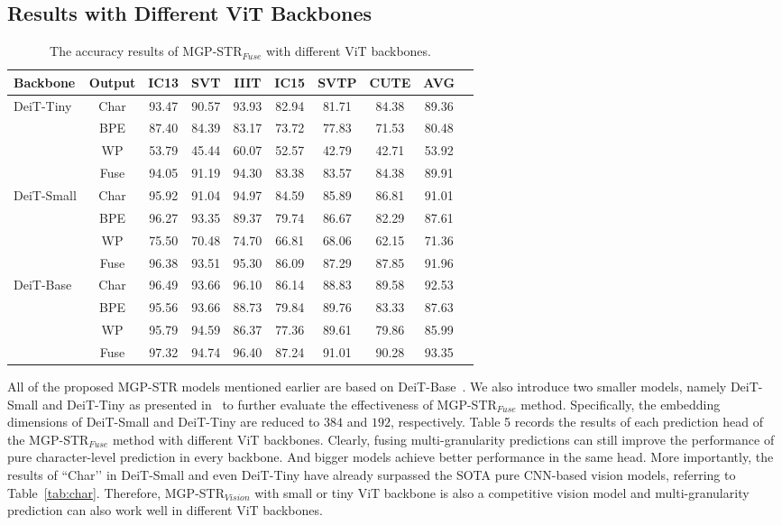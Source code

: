 \documentclass[runningheads]{llncs}
\newcommand{\ra}[1]{\renewcommand{\arraystretch}{#1}}
\begin{document}
\subsection{Results with Different ViT Backbones} 

\begin{table*}[t]\centering
\setlength{\tabcolsep}{5pt}
\ra{1}
\caption{The accuracy results of MGP-STR$_{Fuse}$ with different ViT backbones.}
\label{tab:y0}
\begin{tabular}{|l|c|c|c|c|c|c|c|c|c|}
\hline
Backbone & Output &IC13&SVT  &IIIT   & IC15 & SVTP &CUTE  &AVG \\
\hline
\multirow{4}{*}{DeiT-Tiny}  &  Char &93.47	&90.57	&93.93	&82.94	&81.71	&84.38	&89.36	 \\
&  BPE &87.40	&84.39	&83.17	&73.72	&77.83	&71.53	&80.48	 \\
&  WP &53.79	&45.44	&60.07	&52.57	&42.79	&42.71	&53.92	 \\
&  Fuse &94.05	&91.19	&94.30	&83.38	&83.57	&84.38	&89.91	 \\
\hline
\multirow{4}{*}{DeiT-Small}  &  Char &95.92	&91.04	&94.97	&84.59	&85.89	&86.81	&91.01	 \\
&  BPE &96.27	&93.35	&89.37	&79.74	&86.67	&82.29	&87.61	 \\
&  WP &75.50	&70.48	&74.70	&66.81	&68.06	&62.15	&71.36	 \\
&  Fuse &96.38	&93.51	&95.30	&86.09	&87.29	&87.85	&91.96	 \\
\hline
\multirow{4}{*}{DeiT-Base}  &  Char &96.49	&93.66	&96.10	&86.14	&88.83	&89.58	&92.53	 \\
&  BPE &95.56	&93.66	&88.73	&79.84	&89.76	&83.33	&87.63	 \\
&  WP  &95.79	&94.59	&86.37	&77.36	&89.61	&79.86	&85.99	 \\
&  Fuse &97.32	&94.74	&96.40	&87.24	&91.01	&90.28	&93.35	 \\
\hline
\end{tabular}
\end{table*}

All of the proposed MGP-STR models mentioned earlier are based on DeiT-Base~\cite{deit}. We also introduce two smaller models, namely DeiT-Small and DeiT-Tiny as presented in~\cite{deit} to further evaluate the effectiveness of MGP-STR$_{Fuse}$ method. Specifically, the embedding dimensions of DeiT-Small and DeiT-Tiny are reduced to $384$ and $192$, respectively. Table 5 records the results of each prediction head of the MGP-STR$_{Fuse}$ method with different ViT backbones. Clearly, fusing multi-granularity predictions can still improve the performance of pure character-level prediction in every backbone. And bigger models achieve better performance in the same  head. More importantly, the results of ``Char’’ in DeiT-Small and even DeiT-Tiny have already surpassed the SOTA pure CNN-based vision models, referring to Table~\ref{tab:char}. Therefore, MGP-STR$_{Vision}$ with small or tiny ViT backbone is also a competitive vision model and multi-granularity prediction can also work well in different ViT backbones. 
\end{document}

